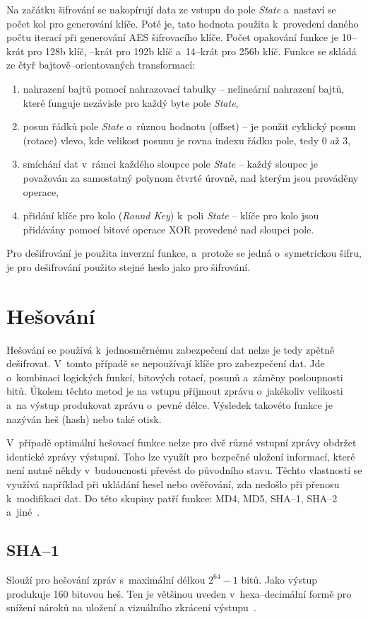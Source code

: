 Na začátku šifrování se nakopírují data ze vstupu do pole {\it State} a~nastaví se počet kol pro
generování klíče. Poté je, tato hodnota použita k~provedení daného počtu iterací při generování AES
šifrovacího klíče. Počet opakování funkce je 10--krát pro 128b klíč, --krát pro 192b
klíč a~14--krát
pro 256b klíč. Funkce se skládá ze čtyř bajtově--orientovaných transformací:
    \begin{enumerate}
    \item nahrazení bajtů pomocí nahrazovací tabulky -- nelineární nahrazení bajtů, které funguje
        nezávisle pro každý byte pole {\it State},
    \item posun řádků pole {\it State} o~různou hodnotu (offset) -- je použit cyklický posun
        (rotace) vlevo, kde velikost posunu je rovna indexu řádku pole, tedy 0 až 3,
    \item smíchání dat v~rámci každého sloupce pole {\it State} -- každý sloupec je považován za
        samostatný polynom čtvrté úrovně, nad kterým jsou prováděny operace,
    \item přidání klíče pro kolo ({\it Round Key}) k~poli {\it State} -- klíče pro kolo jsou
	přidávány pomocí bitové operace XOR provedené nad sloupci pole.
\end{enumerate}
Pro dešifrování je použita inverzní funkce, a~protože se jedná o~symetrickou šifru, je pro dešifrování
použito stejné heslo jako pro šifrování.

\section{Hešování}
Hešování se používá k~jednosměrnému zabezpečení dat nelze je tedy zpětně dešifrovat. V~tomto případě
se nepoužívají klíče pro zabezpečení dat. Jde o~kombinaci logických funkcí, bitových rotací, posunů
a~záměny posloupnosti bitů. Úkolem těchto metod je na vstupu přijmout zprávu o~jakékoliv velikosti
a~na výstup produkovat zprávu o~pevné délce. Výsledek takovéto funkce je nazýván heš (hash) nebo
také otisk. 

 V~případě optimální hešovací funkce nelze pro dvě různé vstupní zprávy obdržet identické zprávy
výstupní. Toho lze využít pro bezpečné uložení informací, které není nutné někdy v~budoucnosti
převést do původního stavu. Těchto vlastností se využívá například při ukládání hesel nebo
ověřování, zda nedošlo při přenosu k~modifikaci dat. Do této skupiny patří funkce: MD4, MD5, SHA--1,
SHA--2 a~jiné~\cite{AC:1996}.

\subsection{SHA--1}
Slouží pro hešování zpráv s~maximální délkou $2^{64}-1$ bitů. Jako výstup produkuje 160 bitovou
heš. Ten je většinou uveden v~hexa--decimální formě pro snížení nároků na uložení
a vizuálního zkrácení výstupu~\cite{NIST:2015}. 

